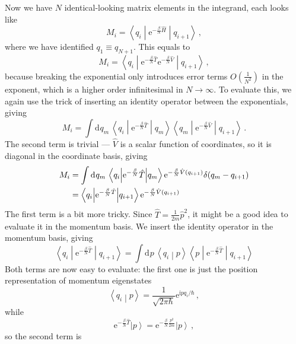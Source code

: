 \documentclass{article}
\theoremstyle{plain}\theoremheaderfont{\normalfont\itshape}\theorembodyfont{\rmfamily}\theoremseparator{.}\newtheorem*{rem}{Remark}\newtheorem*{ex}{Example}\newtheorem*{proof}{Proof}\newtheorem*{altp}{Alternative proof}
\theoremstyle{plain}\theoremheaderfont{\normalfont\bfseries}\theorembodyfont{\rmfamily}\theoremseparator{.}\newtheorem{thm}{Theorem}[section]\newtheorem{lem}[thm]{Lemma}\newtheorem{prop}[thm]{Proposition}\newtheorem*{cor}{Corollary}\newtheorem{defn}[thm]{Definition}\newtheorem{clm}[thm]{Claim}\newtheorem{clminproof}{Claim}
\theoremstyle{break}\theoremheaderfont{\normalfont\itshape}\theorembodyfont{\rmfamily}\theoremseparator{.\medskip}\newtheorem*{proofskip}{Proof}\newtheorem*{exs}{Examples}\newtheorem*{rems}{Remarks}
\theoremstyle{break}\theoremheaderfont{\normalfont\bfseries}\theorembodyfont{\rmfamily}\theoremseparator{.\medskip}\newtheorem{lemskip}[thm]{Lemma}\newtheorem{defnskip}[thm]{Definition}\newtheorem{propskip}[thm]{Proposition}\newtheorem{thmskip}[thm]{Theorem}
\numberwithin{equation}{section}
\newcommand{\ii}{\mathrm{i}}
\newcommand{\ee}{\mathrm{e}}
\newcommand{\dd}[2][]{\mathrm{d}^{#1} #2\,}
\newcommand{\ket}[1]{\left| #1 \right\rangle}
\newcommand{\braket}[2]{\left\langle #1 \middle| #2 \right\rangle}
\newcommand{\mel}[3]{\left\langle #1 \middle| #2 \middle| #3 \right\rangle}
\begin{document}
    Now we have \(N\) identical-looking matrix elements in the integrand, each looks like
    \begin{equation}
        M_i=\mel{q_i}{\ee^{-\frac{\beta}{N}\hat{H}}}{q_{i+1}}\,,
    \end{equation}
    where we have identified \(q_{1}\equiv q_{N+1}\). This equals to
    \begin{equation}
        M_i=\mel{q_i}{\ee^{-\frac{\beta}{N}\hat{T}}\ee^{-\frac{\beta}{N}\hat{V}}}{q_{i+1}}\,,
    \end{equation}
    because breaking the exponential only introduces error terms \(O(\frac{1}{N^2})\) in the exponent, which is a higher order infinitesimal in \(N\to\infty\). To evaluate this, we again use the trick of inserting an identity operator between the exponentials, giving
    \begin{equation}
        M_i=\int\dd{q_m}\mel{q_i}{\ee^{-\frac{\beta}{N}\hat{T}}}{q_m}\mel{q_m}{\ee^{-\frac{\beta}{N}\hat{V}}}{q_{i+1}}\,.
    \end{equation}
    The second term is trivial --- \(\hat{V}\) is a scalar function of coordinates, so it is diagonal in the coordinate basis, giving
    \begin{align}
        M_i&=\int\dd{q_m}\mel{q_i}{\ee^{-\frac{\beta}{N}}\hat{T}}{q_m}\ee^{-\frac{\beta}{N}\hat{V}(q_{i+1})}\delta(q_m-q_{i+1})\notag\\
        &=\mel{q_i}{\ee^{-\frac{\beta}{N}\hat{T}}}{q_{i+1}}\ee^{-\frac{\beta}{N}\hat{V}(q_{i+1})}
    \end{align}
    The first term is a bit more tricky. Since \(\hat{T}=\frac{1}{2m}\hat{p}^2\), it might be a good idea to evaluate it in the momentum basis. We insert the identity operator in the momentum basis, giving
    \begin{equation}
        \mel{q_i}{\ee^{-\frac{\beta}{N}\hat{T}}}{q_{i+1}}=\int\dd{p}\braket{q_i}{p}\mel{p}{\ee^{-\frac{\beta}{N}\hat{T}}}{q_{i+1}}
    \end{equation}
    Both terms are now easy to evaluate: the first one is just the position representation of momentum eigenstates
    \begin{equation}
        \braket{q_i}{p}=\frac{1}{\sqrt{2\pi\hbar}}\ee^{\ii p q_i/\hbar}\,,
    \end{equation}
    while
    \begin{equation}
        \ee^{-\frac{\beta}{N}\hat{T}}\ket{p}=\ee^{-\frac{\beta}{N}\frac{p^2}{2m}}\ket{p}\,,
    \end{equation}
    so the second term is
\end{document}
